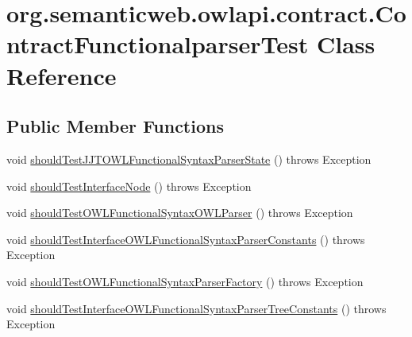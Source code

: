 \hypertarget{classorg_1_1semanticweb_1_1owlapi_1_1contract_1_1_contract_functionalparser_test}{\section{org.\-semanticweb.\-owlapi.\-contract.\-Contract\-Functionalparser\-Test Class Reference}
\label{classorg_1_1semanticweb_1_1owlapi_1_1contract_1_1_contract_functionalparser_test}
}
\subsection*{Public Member Functions}
\begin{DoxyCompactItemize}
\item 
void \hyperlink{classorg_1_1semanticweb_1_1owlapi_1_1contract_1_1_contract_functionalparser_test_aa88914228b69ccdaa1e693ef212189f3}{should\-Test\-J\-J\-T\-O\-W\-L\-Functional\-Syntax\-Parser\-State} ()  throws Exception 
\item 
void \hyperlink{classorg_1_1semanticweb_1_1owlapi_1_1contract_1_1_contract_functionalparser_test_ade1179a09a84504aa09c6fa0e59bf171}{should\-Test\-Interface\-Node} ()  throws Exception 
\item 
void \hyperlink{classorg_1_1semanticweb_1_1owlapi_1_1contract_1_1_contract_functionalparser_test_a4e6a300ccdb206ea2ec8b6b9ec93b91a}{should\-Test\-O\-W\-L\-Functional\-Syntax\-O\-W\-L\-Parser} ()  throws Exception 
\item 
void \hyperlink{classorg_1_1semanticweb_1_1owlapi_1_1contract_1_1_contract_functionalparser_test_a6eb281cab0af84f4640cfef7460a0be5}{should\-Test\-Interface\-O\-W\-L\-Functional\-Syntax\-Parser\-Constants} ()  throws Exception 
\item 
void \hyperlink{classorg_1_1semanticweb_1_1owlapi_1_1contract_1_1_contract_functionalparser_test_a90d61ca7258f57b041d36a8c7a2cdeef}{should\-Test\-O\-W\-L\-Functional\-Syntax\-Parser\-Factory} ()  throws Exception 
\item 
void \hyperlink{classorg_1_1semanticweb_1_1owlapi_1_1contract_1_1_contract_functionalparser_test_a6ba9b0594da026ee655d7a1529899842}{should\-Test\-Interface\-O\-W\-L\-Functional\-Syntax\-Parser\-Tree\-Constants} ()  throws Exception 
\end{DoxyCompactItemize}


